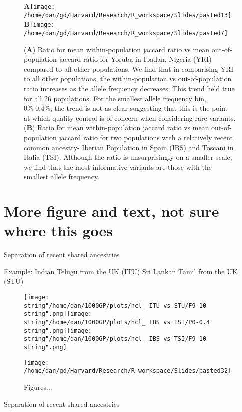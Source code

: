 \documentclass[english]{article}
\begin{document}
\begin{figure}
\textbf{A}\texttt{[image: /home/dan/gd/Harvard/Research/R\_workspace/Slides/pasted13]}\textbf{B}\texttt{[image: /home/dan/gd/Harvard/Research/R\_workspace/Slides/pasted7]}\caption{(\textbf{A}) Ratio for mean within-population jaccard ratio vs mean
out-of-population jaccard ratio for Yoruba in Ibadan, Nigeria (YRI)
compared to all other populations. We find that in comparising YRI
to all other populations, the within-population vs out-of-population
ratio increases as the allele frequency decreases. This trend held
true for all 26 populations. For the smallest allele frequency bin,
0\%-0.4\%, the trend is not as clear suggesting that this is the point
at which quality control is of concern when considering rare variants.
(\textbf{B}) Ratio for mean within-population jaccard ratio vs mean
out-of-population jaccard ratio for two populations with a relatively
recent common ancestry- Iberian Population in Spain (IBS) and Toscani
in Italia (TSI). Although the ratio is unsurprisingly on a smaller
scale, we find that the most informative variants are those with the
smallest allele frequency.}
\end{figure}



\section*{More figure and text, not sure where this goes}

Separation of recent shared ancestries

{\tiny Example:
Indian Telugu from the UK (ITU) 
Sri Lankan Tamil from the UK (STU)}

\begin{figure}
\texttt{[image: \\string"/home/dan/1000GP/plots/hcl\_ ITU vs STU/F9-10\\string".png]}\texttt{[image: \\string"/home/dan/1000GP/plots/hcl\_ IBS vs TSI/P0-0.4\\string".png]}\texttt{[image: \\string"/home/dan/1000GP/plots/hcl\_ IBS vs TSI/F9-10\\string".png]}

\texttt{[image: /home/dan/gd/Harvard/Research/R\_workspace/Slides/pasted32]}\caption{Figures...}
\end{figure}


Separation of recent shared ancestries
\end{document}
